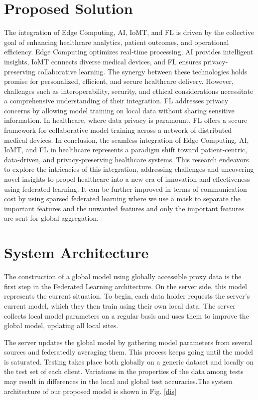 \documentclass[conference]{IEEEtran}
\begin{document}
\section{Proposed Solution}
The integration of Edge Computing, AI, IoMT, and FL is driven by the collective goal of enhancing healthcare analytics, patient outcomes, and operational efficiency. Edge Computing optimizes real-time processing, AI provides intelligent insights, IoMT connects diverse medical devices, and FL ensures privacy-preserving collaborative learning. The synergy between these technologies holds promise for personalized, efficient, and secure healthcare delivery. However, challenges such as interoperability, security, and ethical considerations necessitate a comprehensive understanding of their integration. FL addresses privacy concerns by allowing model training on local data without sharing sensitive information. In healthcare, where data privacy is paramount, FL offers a secure framework for collaborative model training across a network of distributed medical devices. In conclusion, the seamless integration of Edge Computing, AI, IoMT, and FL in healthcare represents a paradigm shift toward patient-centric, data-driven, and privacy-preserving healthcare systems. This research endeavors to explore the intricacies of this integration, addressing challenges and uncovering novel insights to propel healthcare into a new era of innovation and effectiveness using federated learning. It can be further improved in terms of communication cost by using sparsed federated learning where we use a mask to separate the important features and the unwanted features and only the important features are sent for global aggregation.

\section{System Architecture}
The construction of a global model using globally accessible proxy data is the first step in the Federated Learning architecture. On the server side, this model represents the current situation. To begin, each data holder requests the server's current model, which they then train using their own local data. The server collects local model parameters on a regular basis and uses them to improve the global model, updating all local sites. 

The server updates the global model by gathering model parameters from several sources and federatedly averaging them. This process keeps going until the model is saturated. Testing takes place both globally on a generic dataset and locally on the test set of each client. Variations in the properties of the data among tests may result in differences in the local and global test accuracies.The system architecture of our proposed model is shown in Fig. \ref{dis}
\end{document}
